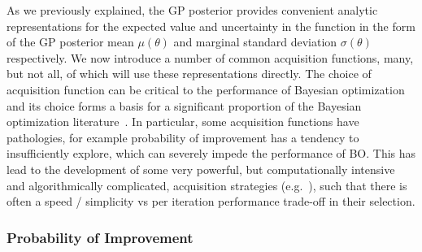 As we previously explained, the GP posterior provides convenient analytic representations
for the expected value and uncertainty in the function in the form of the GP posterior mean 
$\mu (\theta)$ and marginal standard deviation $\sigma (\theta)$ respectively.  We now
introduce a number of common acquisition functions, many, but not all, of which will use
these representations directly.
The choice of acquisition function can be critical to the performance of Bayesian optimization
and its choice forms a basis for a significant proportion of the Bayesian optimization
literature~\citep{shahriari2016taking}.  In particular, some acquisition functions have
pathologies, for example probability of improvement has a tendency to insufficiently explore, which can severely impede the
performance of BO.  This has lead to the development of some very powerful, but computationally
intensive and algorithmically complicated, acquisition strategies (e.g.~\cite{hernandez2014predictive}), 
such that there is often a speed / simplicity vs per iteration performance trade-off in their selection.


\subsubsection{Probability of Improvement}
\label{sec:opt:BO:acq:prob}

